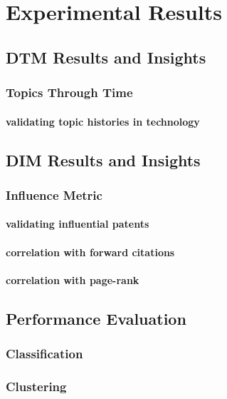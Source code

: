 
\chapter{Experimental Results} %

\label{Chapter4} %


\section{DTM Results and Insights}

\subsection{Topics Through Time}



\subsubsection{validating topic histories in technology}



\section{DIM Results and Insights}

\subsection{Influence Metric}

\subsubsection{validating influential patents}

\subsubsection{correlation with forward citations}

\subsubsection{correlation with page-rank}




\section{Performance Evaluation} 

\subsection{Classification}


\subsection{Clustering}

